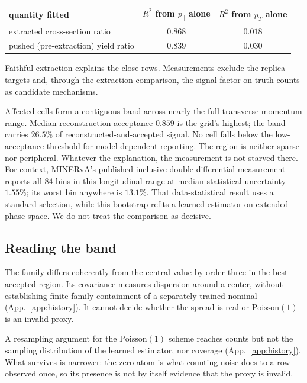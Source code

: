 \begin{center}
\begin{tabular}{lcc}
\hline
quantity fitted & $R^{2}$ from $p_{\parallel}$ alone & $R^{2}$ from $p_{T}$ alone \\
\hline
extracted cross-section ratio & $0.868$ & $0.018$ \\
pushed (pre-extraction) yield ratio & $0.839$ & $0.030$ \\
\hline
\end{tabular}
\end{center}

Faithful extraction explains the close rows. Measurements exclude the replica targets and, through the extraction comparison, the signal factor on truth counts as candidate mechanisms.

Affected cells form a contiguous band across nearly the full transverse-momentum range. Median reconstruction acceptance $0.859$ is the grid's highest; the band carries $26.5\%$ of reconstructed-and-accepted signal. No cell falls below the low-acceptance threshold for model-dependent reporting. The region is neither sparse nor peripheral. Whatever the explanation, the measurement is not starved there. For context, MINERvA's published inclusive double-differential measurement reports all $84$ bins in this longitudinal range at median statistical uncertainty $1.55\%$; its worst bin anywhere is $13.1\%$. That data-statistical result uses a standard selection, while this bootstrap refits a learned estimator on extended phase space. We do not treat the comparison as decisive.

\subsection{Reading the band}

The family differs coherently from the central value by order three in the best-accepted region. Its covariance measures dispersion around a center, without establishing finite-family containment of a separately trained nominal (App.~\ref{app:history}). It cannot decide whether the spread is real or $\mathrm{Poisson}(1)$ is an invalid proxy.

A resampling argument for the $\mathrm{Poisson}(1)$ scheme reaches counts but not the sampling distribution of the learned estimator, nor coverage (App.~\ref{app:history}). What survives is narrower: the zero atom is what counting noise does to a row observed once, so its presence is not by itself evidence that the proxy is invalid.

